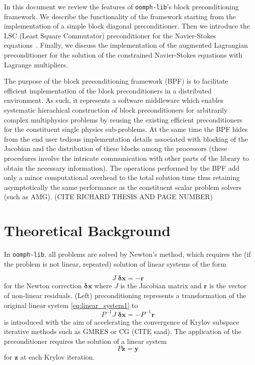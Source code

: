 In this document we review the features of \texttt{oomph-lib}'s block 
preconditioning framework. We describe the functionality of the 
framework starting from the implementation of a simple block diagonal 
preconditioner. Then we introduce the LSC (Least Square Commutator) 
preconditioner for the Navier-Stokes equations~\cite{fastiterativesolvers}. 
Finally, we discuss the implementation of the augmented Lagrangian 
preconditioner for the solution of the constrained Navier-Stokes equations with
Lagrange multipliers.

The purpose of the block preconditioning framework (BPF) is to facilitate 
efficient implementation of the block preconditioners in a distributed 
environment. As such, it represents a software middleware which enables 
systematic hierachical construction of block preconditioners for arbitrarily 
complex multiphysics problems by reusing the existing efficient preconditioners
for the constituent single physics sub-problems. At the same time the BPF hides
from the end user tedious implementation details associated with blocking of 
the Jacobian and the distribution of these blocks among the processors (these 
procedures involve the intricate communication with other parts of the library 
to obtain the necessary information). The operations performed by the BPF add 
only a minor computational overhead to the total solution time thus retaining 
asymptotically the same performance as the constituent scalar problem solvers 
(such as AMG). (CITE RICHARD THESIS AND PAGE NUMBER)

\section{ Theoretical Background\label{sec:theoretical_background}}
In \texttt{oomph-lib}, all problems are solved by Newton's method, which requires
the (if the problem is not linear, repeated) solution of linear systems of the 
form

\begin{equation}
J\;\mathbf{\delta x} = -\mathbf{r}
\label{eq:linear_system1}
\end{equation}
for the Newton correction $\mathbf{\delta x}$ where $J$ is the
Jacobian matrix and $\mathbf{r}$ is the vector of non-linear residuals. (Left) 
preconditioning represents a transformation of the original linear system 
\eqref{eq:linear_system1} to
\begin{equation*}
P^{-1}J\;\mathbf{ \delta x}=-P^{-1}\mathbf{r}
\end{equation*}
is introduced with the aim of accelerating the convergence of Krylov subspace 
iterative methods such as GMRES or CG (CITE saad). The application of the 
preconditioner requires the solution of a linear system
\begin{equation*}
P\mathbf{z}=\mathbf{y}
\end{equation*}
for $\mathbf{z}$ at each Krylov iteration.

